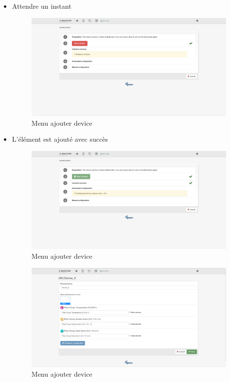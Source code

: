 \begin{itemize}
\item Attendre un instant

\begin{figure}[h]
	\center
	\includegraphics[scale=0.5]{./Images/png/add2_zwaveme.png}
	\caption{Menu ajouter device}
\end{figure}


\item L'élément est ajouté avec succès

\begin{figure}[h]
	\center
	\includegraphics[scale=0.5]{./Images/png/add3_zwaveme.png}
	\caption{Menu ajouter device}
\end{figure}

\begin{figure}[h]
	\center
	\includegraphics[scale=0.5]{./Images/png/add4_zwaveme.png}
	\caption{Menu ajouter device}
\end{figure}



\end{itemize}
